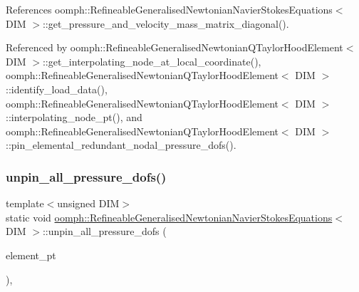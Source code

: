 References oomph\+::\+Refineable\+Generalised\+Newtonian\+Navier\+Stokes\+Equations$<$ D\+I\+M $>$\+::get\+\_\+pressure\+\_\+and\+\_\+velocity\+\_\+mass\+\_\+matrix\+\_\+diagonal().



Referenced by oomph\+::\+Refineable\+Generalised\+Newtonian\+Q\+Taylor\+Hood\+Element$<$ D\+I\+M $>$\+::get\+\_\+interpolating\+\_\+node\+\_\+at\+\_\+local\+\_\+coordinate(), oomph\+::\+Refineable\+Generalised\+Newtonian\+Q\+Taylor\+Hood\+Element$<$ D\+I\+M $>$\+::identify\+\_\+load\+\_\+data(), oomph\+::\+Refineable\+Generalised\+Newtonian\+Q\+Taylor\+Hood\+Element$<$ D\+I\+M $>$\+::interpolating\+\_\+node\+\_\+pt(), and oomph\+::\+Refineable\+Generalised\+Newtonian\+Q\+Taylor\+Hood\+Element$<$ D\+I\+M $>$\+::pin\+\_\+elemental\+\_\+redundant\+\_\+nodal\+\_\+pressure\+\_\+dofs().

\mbox{\label{classoomph_1_1RefineableGeneralisedNewtonianNavierStokesEquations_a14f60d97099b74ad44fba69722f2e59a}} 
\subsubsection{\texorpdfstring{unpin\+\_\+all\+\_\+pressure\+\_\+dofs()}{unpin\_all\_pressure\_dofs()}}
{\footnotesize\ttfamily template$<$unsigned D\+IM$>$ \\
static void \hyperlink{classoomph_1_1RefineableGeneralisedNewtonianNavierStokesEquations}{oomph\+::\+Refineable\+Generalised\+Newtonian\+Navier\+Stokes\+Equations}$<$ D\+IM $>$\+::unpin\+\_\+all\+\_\+pressure\+\_\+dofs (\begin{DoxyParamCaption}\item[{const \hyperlink{classoomph_1_1Vector}{Vector}$<$ \hyperlink{classoomph_1_1GeneralisedElement}{Generalised\+Element} $\ast$$>$ \&}]{element\+\_\+pt }\end{DoxyParamCaption})\hspace{0.3cm}{\ttfamily [inline]}, {\ttfamily [static]}}



